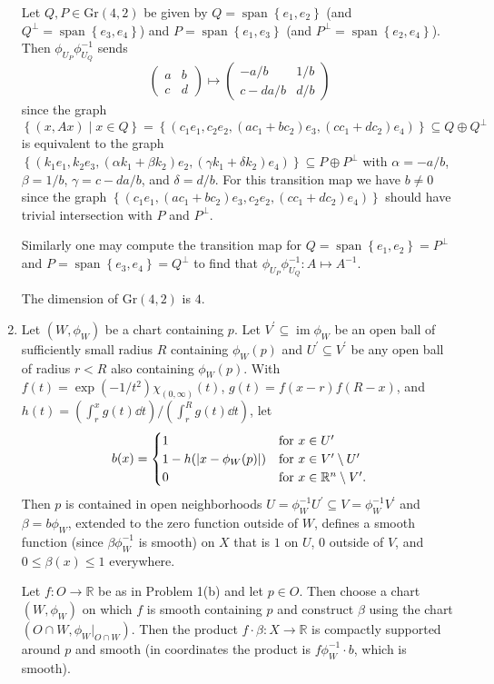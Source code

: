 \documentclass[11pt,leqno]{article}
\theoremstyle{plain}
\theoremstyle{definition}
\numberwithin{equation}{section}
\numberwithin{lem}{section}
\newcommand{\cbr}[1]{\left\{#1\right\}}
\DeclareMathOperator{\Span}{span}
\DeclareMathOperator{\im}{im}
\newcommand{\Gr}{\mathrm{Gr}}
\begin{document}
\begin{enumerate}
    Let $Q,P\in \Gr(4,2)$ be given by $Q = \Span\cbr{e_1,e_2}$ (and $Q^\perp = \Span\cbr{e_3,e_4}$) and $P = \Span\cbr{e_1,e_3}$ (and $P^\perp = \Span\cbr{e_2,e_4}$). Then $\phi_{U_P}\phi_{U_Q}^{-1}$ sends 
    \[\begin{pmatrix}
      a & b \\ c & d
    \end{pmatrix}\mapsto \begin{pmatrix}
      -a/b & 1/b \\ c - da/b & d/b
    \end{pmatrix}\]
    since the graph $\cbr{(x,Ax)\mid x\in Q} = \cbr{(c_1e_1,c_2e_2,(ac_1+bc_2)e_3, (cc_1+dc_2)e_4)}\subseteq Q\oplus Q^\perp$ is equivalent to the graph $\cbr{(k_1e_1,k_2e_3, (\alpha k_1 + \beta k_2)e_2,(\gamma k_1 + \delta k_2)e_4)}\subseteq P\oplus P^\perp$ with $\alpha = -a/b$, $\beta = 1/b$, $\gamma = c-da/b$, and $\delta = d/b$. For this transition map we have $b\neq 0$ since the graph $\cbr{(c_1e_1,(ac_1+bc_2)e_3,c_2e_2,(cc_1+dc_2)e_4)}$ should have trivial intersection with $P$ and $P^\perp$.

    Similarly one may compute the transition map for $Q = \Span\cbr{e_1,e_2} = P^\perp$ and $P = \Span\cbr{e_3,e_4} = Q^\perp$ to find that $\phi_{U_P}\phi_{U_Q}^{-1}\colon A\mapsto A^{-1}$.
    
    The dimension of $\Gr(4,2)$ is $4$.
    \item Let $(W,\phi_W)$ be a chart containing $p$. Let $V^\prime\subseteq \im\phi_W$ be an open ball of sufficiently small radius $R$ containing $\phi_W(p)$ and $U^\prime\subseteq V^\prime$ be any open ball of radius $r<R$ also containing $\phi_W(p)$. With $f(t) = \exp(-1/t^2)\chi_{(0,\infty)}(t)$, $g(t) = f(x-r)f(R-x)$, and $h(t) = (\int_r^xg(t)\dd t)/(\int_r^Rg(t)\dd t)$, let 
    \[b(x) = \begin{cases}
      1 & \text{for }x\in U^\prime\\
      1-h(\abs{x-\phi_W(p)}) & \text{for }x\in V^\prime\setminus U^\prime\\
      0 & \text{for } x\in \mathbb R^n\setminus V^\prime.
    \end{cases}\]
    Then $p$ is contained in open neighborhoods $U = \phi_W^{-1}U^\prime\subseteq V = \phi_W^{-1}V^\prime$ and $\beta = b\phi_W$, extended to the zero function outside of $W$, defines a smooth function (since $\beta\phi_W^{-1}$ is smooth) on $X$ that is $1$ on $U$, $0$ outside of $V$, and $0\leq \beta(x)\leq 1$ everywhere. 

    Let $f\colon O\to \mathbb R$ be as in Problem 1(b) and let $p\in O$. Then choose a chart $(W,\phi_W)$ on which $f$ is smooth containing $p$ and construct $\beta$ using the chart $(O\cap W,\phi_W|_{O\cap W})$. Then the product $f\cdot\beta\colon X\to\mathbb R$ is compactly supported around $p$ and smooth (in coordinates the product is $f\phi_W^{-1}\cdot b$, which is smooth).
\end{enumerate}
\end{document}
